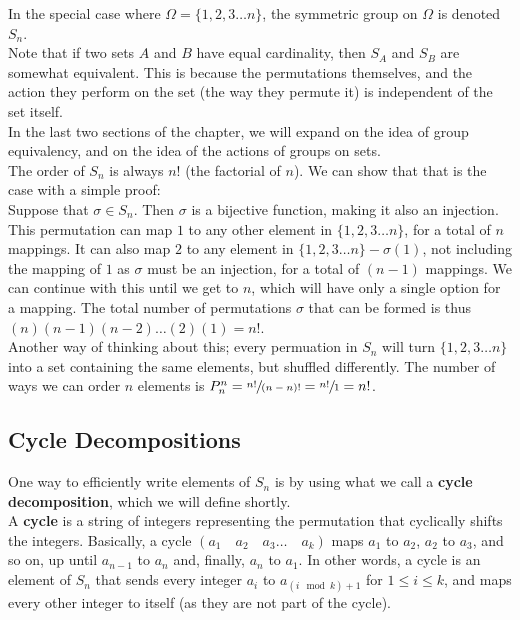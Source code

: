 \documentclass[12pt]{article}
\begin{document}
    In the special case where $\Omega = \{ 1, 2, 3 \dots n\}$,
    the symmetric group on $\Omega$ is denoted $S_n$. \\

    Note that if two sets $A$ and $B$ have equal cardinality,
    then $S_A$ and $S_B$ are somewhat equivalent.
    This is because the permutations themselves,
    and the action they perform on the set (the way they permute it)
    is independent of the set itself. \\
    In the last two sections of the chapter,
    we will expand on the idea of group equivalency,
    and on the idea of the actions of groups on sets. \\

    The order of $S_n$ is always $n!$ (the factorial of $n$).
    We can show that that is the case with a simple proof: \\
    Suppose that $\sigma \in S_n$.
    Then $\sigma$ is a bijective function, making it also an injection.
    This permutation can map $1$ to any other element
    in $\{1, 2, 3 \dots n\}$,
    for a total of $n$ mappings.
    It can also map $2$ to any element in 
    $\{1, 2, 3 \dots n\} - \sigma(1)$,
    not including the mapping of $1$ as $\sigma$ must be an injection,
    for a total of $(n-1)$ mappings.
    We can continue with this until we get to $n$,
    which will have only a single option for a mapping.
    The total number of permutations $\sigma$ that can be formed
    is thus $(n)(n-1)(n-2)\dots(2)(1) = n!$. \\
    Another way of thinking about this;
    every permuation in $S_n$ will turn $\{1, 2, 3 \dots n\}$
    into a set containing the same elements, but shuffled differently.
    The number of ways we can order $n$ elements
    is $P_n^n = \sfrac{n!}{(n-n)!} = \sfrac{n!}{1} = n!$. \\

    
    \subsection*{Cycle Decompositions}

    One way to efficiently write elements of $S_n$
    is by using what we call a \textbf{cycle decomposition},
    which we will define shortly. \\

    A \textbf{cycle} is a string of integers representing the permutation
    that cyclically shifts the integers.
    Basically, a cycle $(a_1 \quad a_2 \quad a_3 \dots \quad a_k)$
    maps $a_1$ to $a_2$, $a_2$ to $a_3$, and so on,
    up until $a_{n-1}$ to $a_n$ and, finally, $a_n$ to $a_1$.
    In other words,
    a cycle is an element of $S_n$ that
    sends every integer $a_i$ to $a_{(i \mod k) + 1}$
    for $1 \leqslant i \leqslant k$,
    and maps every other integer to itself
    (as they are not part of the cycle). \\
\end{document}
